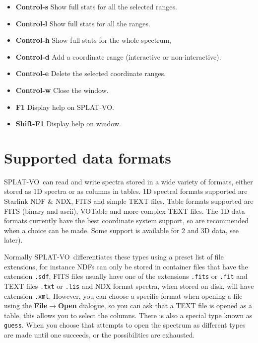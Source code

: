 \documentclass[twoside,11pt]{article}
\newcommand{\latexhtml}[2]{#1}
\newcommand{\xlabel}[1]{}
\renewcommand{\_}{\texttt{\symbol{95}}}
\newcommand{\SPLAT}{\textsf{SPLAT-VO}}
\newcommand{\submenuitem}[2]{\latexhtml{\textbf{#1$\rightarrow$#2}}{\textbf{#1->#2}}}
\newcommand{\labelitem}[1]{\textbf{#1}}
\newcommand{\hitext}[1]{\texttt{#1}}
\begin{document}
\begin{itemize}
\item \labelitem{Control-s} Show full stats for all the selected ranges.
\item \labelitem{Control-l} Show full stats for all the ranges.
\item \labelitem{Control-h} Show full stats for the whole spectrum,

\item \labelitem{Control-d} Add a coordinate range (interactive or non-interactive).
\item \labelitem{Control-e} Delete the selected coordinate ranges.
 
\item \labelitem{Control-w} Close the window.
\item \labelitem{F1} Display help on \SPLAT.     
\item \labelitem{Shift-F1} Display help on window.
\end{itemize}


\newpage
\section{Supported data formats\xlabel{data_formats}}

\SPLAT\ can read and write spectra stored in a wide variety of formats, either
stored as 1D spectra or as columns in tables. 1D spectral formats supported
are Starlink NDF \& NDX, FITS and simple TEXT files. Table formats supported
are FITS (binary and ascii), VOTable and more complex TEXT files. The 1D data
formats currently have the best coordinate system support, so are recommended
when a choice can be made. Some support is available for 2 and 3D data, see
later).

Normally \SPLAT\ differentiates these types using a preset list of file
extensions, for instance NDFs can only be stored in container files that have
the extension \hitext{.sdf}, FITS files usually have one of the extensions
\hitext{.fits} or \hitext{.fit} and TEXT files \hitext{.txt} or \hitext{.lis}
and NDX format spectra, when stored on disk, will have extension
\hitext{.xml}. However, you can choose a specific format when opening a file
using the \submenuitem{File}{Open} dialogue, so you can ask that a TEXT file
is opened as a table, this allows you to select the columns. There is also a
special type known as \hitext{guess}. When you choose that attempts to open
the spectrum as different types are made until one succeeds, or the
possibilities are exhausted.
\end{document}
